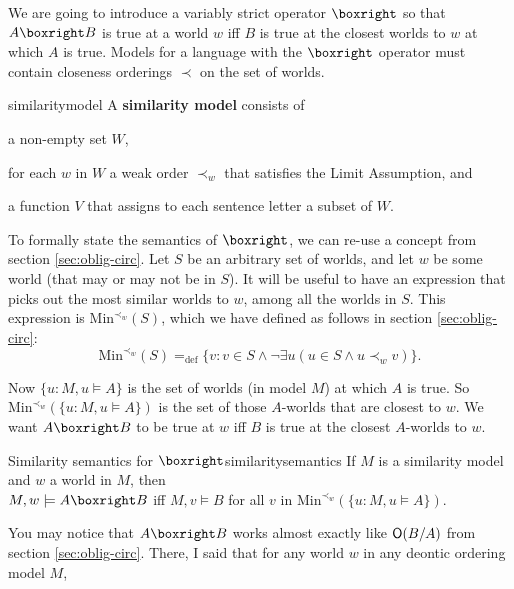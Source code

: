 We are going to introduce a variably strict operator $\boxright$ so that
$A\boxright B$ is true at a world $w$ iff $B$ is true at the closest worlds to
$w$ at which $A$ is true. Models for a language with the $\boxright$ operator
must contain closeness orderings $\prec$ on the set of worlds.

\begin{definition}{}{similaritymodel}
  A \textbf{similarity model} consists of
  \vspace{-3mm}
  \begin{itemize*}
  \item a non-empty set $W$,
  \item for each $w$ in $W$ a weak order $\prec_w$ that satisfies the Limit
  Assumption, and
  \item a function $V$ that assigns to each sentence letter a subset of $W$.
  \end{itemize*}
\end{definition}

To formally state the semantics of $\boxright$, we can re-use a concept from
section \ref{sec:oblig-circ}. Let $S$ be an arbitrary set of worlds, and let $w$
be some world (that may or may not be in $S$). It will be useful to have an
expression that picks out the most similar worlds to $w$, among all the worlds in
$S$. This expression is $\mathrm{Min}^{\prec_w}(S)$, which we have defined as follows in
section \ref{sec:oblig-circ}:
\[
  \mathrm{Min}^{\prec_w}(S) =_\text{def} \{ v: v \in S \land \neg\exists u (u \in S \land u \prec_w v) \}.
\]

Now $\{ u : M,u\models A \}$ is the set of worlds (in model $M$) at which $A$ is
true. So $\mathrm{Min}^{\prec_w}(\{ u : M,u\models A \})$ is the set of those
$A$-worlds that are closest to $w$. We want $A \boxright B$ to be true at $w$
iff $B$ is true at the closest $A$-worlds to $w$.

\begin{definition}{Similarity semantics for $\boxright$}{similaritysemantics}
  If $M$ is a similarity model and $w$ a world in $M$, then\\[1mm]
  $M,w \models A \boxright B$ iff $M,v \models B$ for all
  $v$ in $\mathrm{Min}^{\prec_w}(\{ u: M,u \models A \})$.
\end{definition}

You may notice that $A \boxright B$ works almost exactly like $\operatorname{\mathsf{O}}(B/A)$ from
section \ref{sec:oblig-circ}. There, I said that for any world $w$ in any deontic
ordering model $M$,

